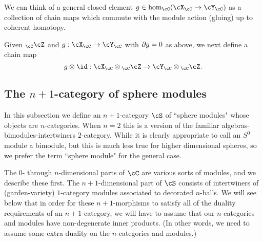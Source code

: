 We can think of a general closed element $g\in \hom_\cC(\cX_\cC \to \cY_\cC)$
as a collection of chain maps which commute with the module action (gluing) up to coherent homotopy.
\medskip

Given $_\cC\cZ$ and  $g: \cX_\cC \to \cY_\cC$ with $\partial g = 0$ as above, we next define a chain map
\[
	g\ot\id : \cX_\cC \ot {}_\cC\cZ \to \cY_\cC \ot {}_\cC\cZ .
\]







\medskip










\subsection{The $n{+}1$-category of sphere modules}
\label{ssec:spherecat}

In this subsection we define an $n{+}1$-category $\cS$ of ``sphere modules" 
whose objects are $n$-categories.
When $n=2$
this is a version of the familiar algebras-bimodules-intertwiners $2$-category.
While it is clearly appropriate to call an $S^0$ module a bimodule,
but this is much less true for higher dimensional spheres, 
so we prefer the term ``sphere module" for the general case.

The $0$- through $n$-dimensional parts of $\cC$ are various sorts of modules, and we describe
these first.
The $n{+}1$-dimensional part of $\cS$ consists of intertwiners
of (garden-variety) $1$-category modules associated to decorated $n$-balls.
We will see below that in order for these $n{+}1$-morphisms to satisfy all of
the duality requirements of an $n{+}1$-category, we will have to assume
that our $n$-categories and modules have non-degenerate inner products.
(In other words, we need to assume some extra duality on the $n$-categories and modules.)

